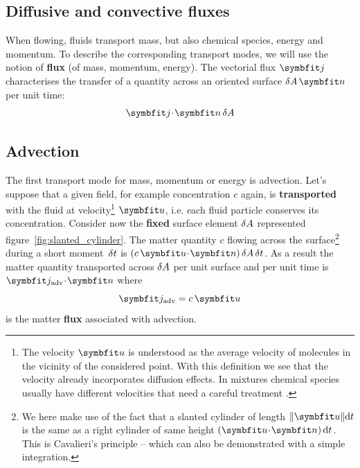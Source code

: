 \subsection{Diffusive and convective fluxes}
\label{sec:flux}
When flowing, fluids transport mass, but also chemical species, energy and momentum. To describe the corresponding transport modes, we will use the notion of \textbf{flux} (of mass, momentum, energy).
The vectorial flux $\bj$ characterises the transfer of a quantity across an oriented surface $\delA \,\bn$ per unit time:
\begin{equation}
\bj \!\cdot\! \bn \,\delA
\end{equation}
\subsection{Advection}
\label{sec:advection}
The first transport mode for mass, momentum or energy is advection.
Let's suppose that a given field, for example concentration $c$ again, is \textbf{transported} with the fluid at velocity\footnote{The velocity $\bu$ is understood as the average velocity of molecules in the vicinity of the considered point. With this definition we see that the velocity already incorporates  diffusion effects. In mixtures chemical species usually have different velocities that need a careful treatment \citep[][\S17.7]{Bird2002}.} $\bu$, i.e. each fluid particle conserves its concentration. Consider now the \textbf{fixed} surface element $\delta A$ represented figure~\ref{fig:slanted_cylinder}. The matter quantity $c$ flowing across the surface\footnote{We here make use of the fact that a slanted cylinder of length $\|\bu\| \mathrm dt$ is the same as a right cylinder of same height $\lp\bu\!\cdot\!\bn\rp \mathrm dt$. This is Cavalieri's principle -- which can also be demonstrated with a simple integration.} during a short moment~$\delta t$ is $\lp c \,\bu \!\cdot\! \bn\rp \delA \,\delt$. 
As a result the matter quantity transported across $\delta A$ per unit surface and per unit time is $\bj_\text{adv} \!\cdot\! \bn$ where 
\begin{equation}
\bj_\text{adv} = c\, \bu
\end{equation}
is the matter \textbf{flux} associated with advection.  

